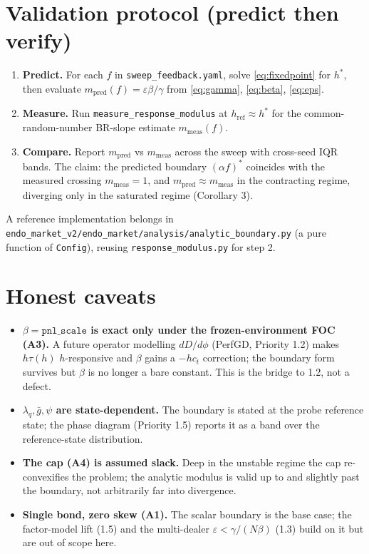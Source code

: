 \documentclass[11pt]{article}
\newcommand{\eps}{\varepsilon}
\newcommand{\gbar}{\bar g}
\newcommand{\href}{h_{\mathrm{ref}}}
\newcommand{\code}[1]{\texttt{#1}}
\begin{document}
\section{Validation protocol (predict then verify)}

\begin{enumerate}[leftmargin=*]
\item \textbf{Predict.} For each $f$ in \code{sweep\_feedback.yaml}, solve
  \eqref{eq:fixedpoint} for $h^*$, then evaluate $m_{\mathrm{pred}}(f)=\eps\beta/\gamma$
  from \eqref{eq:gamma}, \eqref{eq:beta}, \eqref{eq:eps}.
\item \textbf{Measure.} Run \code{measure\_response\_modulus} at $\href\approx h^*$
  for the common-random-number BR-slope estimate $m_{\mathrm{meas}}(f)$.
\item \textbf{Compare.} Report $m_{\mathrm{pred}}$ vs $m_{\mathrm{meas}}$ across the
  sweep with cross-seed IQR bands. The claim: the predicted boundary $(\alpha f)^*$
  coincides with the measured crossing $m_{\mathrm{meas}}=1$, and
  $m_{\mathrm{pred}}\approx m_{\mathrm{meas}}$ in the contracting regime, diverging
  only in the saturated regime (Corollary 3).
\end{enumerate}
%
A reference implementation belongs in
\code{endo\_market\_v2/endo\_market/analysis/analytic\_boundary.py} (a pure
function of \code{Config}), reusing \code{response\_modulus.py} for step 2.

\section{Honest caveats}

\begin{itemize}[leftmargin=*]
\item \textbf{$\beta=\code{pnl\_scale}$ is exact only under the frozen-environment
  FOC (A3).} A future operator modelling $dD/d\phi$ (PerfGD, Priority 1.2) makes
  $h\tau(h)$ $h$-responsive and $\beta$ gains a $-h c_t$ correction; the boundary
  form survives but $\beta$ is no longer a bare constant. This is the bridge to
  1.2, not a defect.
\item \textbf{$\lambda_q,\gbar,\psi$ are state-dependent.} The boundary is stated
  at the probe reference state; the phase diagram (Priority 1.5) reports it as a
  band over the reference-state distribution.
\item \textbf{The cap (A4) is assumed slack.} Deep in the unstable regime the cap
  re-convexifies the problem; the analytic modulus is valid up to and slightly
  past the boundary, not arbitrarily far into divergence.
\item \textbf{Single bond, zero skew (A1).} The scalar boundary is the base case;
  the factor-model lift (1.5) and the multi-dealer $\eps<\gamma/(N\beta)$ (1.3)
  build on it but are out of scope here.
\end{itemize}
\end{document}
